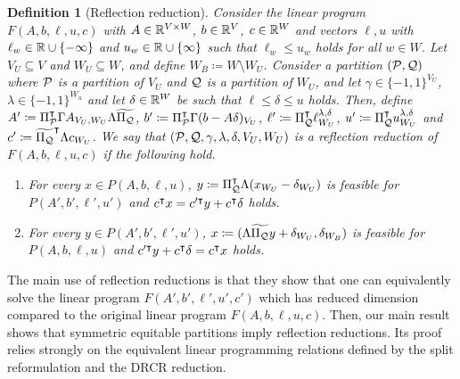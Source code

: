 \documentclass[pdflatex,sn-mathphys-num]{sn-jnl}%
\theoremstyle{thmstyleone}%
\newtheorem{definition}{Definition}
\theoremstyle{thmstylethree}%
\theoremstyle{thmstyletwo}%
\begin{document}
\begin{definition}[Reflection reduction]
    \label{def_refeqpart}
    Consider the linear program $F(A,b,\ell, u, c)$ with $A\in \mathbb{R}^{V\times W}$, $b\in \mathbb{R}^{V}$, $c\in \mathbb{R}^{W}$ and vectors $\ell, u$ with $\ell_w \in \mathbb{R} \cup \{-\infty\}$ and $u_w\in \mathbb{R} \cup \{\infty\} $ such that $\ell_w \leq u_w$ holds for all $w\in W$.
    Let $V_U\subseteq V$ and $W_U\subseteq W$, and define $W_B\coloneqq W\setminus W_U$.
    Consider a partition $(\mathcal{P},\mathcal{Q})$ where $\mathcal{P}$ is a partition of $V_U$ and $\mathcal{Q}$ is a partition of $W_U$, and let $\gamma\in \{-1,1\}^{V_U}$, $\lambda\in \{-1,1\}^{W_u}$ and let $\delta \in \mathbb{R}^W$ be such that $\ell \leq \delta \leq u$ holds.
    Then, define $A'\coloneqq \transpose{\Pi_{\MP}}\Gamma A_{V_U,W_U}\Lambda \widetilde{\Pi_{\MQ}}$, $b'\coloneqq \transpose{\Pi_{\MP}}\Gamma(b- A\delta)_{V_U}$, $\ell' \coloneqq \transpose{\Pi_{\MQ}} \ell^{\lambda,\delta}_{W_U}$, $u'\coloneqq  \transpose{\Pi_{\MQ}} u^{\lambda,\delta}_{W_U}$ and $c'\coloneqq \transpose{\widetilde{\Pi_\MQ}} \Lambda c_{W_U}$.
    We say that $(\mathcal{P},\mathcal{Q},\gamma,\lambda, \delta, V_U, W_U)$ is a \emph{reflection reduction} of $F(A,b,\ell,u,c)$ if the following hold.
    \begin{enumerate}[label=(\roman*)]
        \item \label{def_refeqpart_to_red} For every $x\in P(A,b,\ell,u)$, $y\coloneqq \transpose{\Pi_\MQ} \Lambda (x_{W_U}-\delta_{W_U})$ is feasible for $P(A',b',\ell',u')$ and $c^{\intercal} x = c'^{\intercal} y + c^{\intercal} \delta$ holds.
        \item \label{def_refeqpart_from_red} For every $y\in P(A',b',\ell',u')$,  $x \coloneqq ( \Lambda \widetilde{\Pi_\MQ} y + \delta_{W_U},\delta_{W_B})$ is feasible for $P(A,b,\ell,u)$ and $c'^{\intercal} y + c^{\intercal} \delta = c^{\intercal} x$ holds.
    \end{enumerate}
\end{definition}

The main use of reflection reductions is that they show that one can equivalently solve the linear program $F(A',b',\ell',u',c')$ which has reduced dimension compared to the original linear program $F(A,b,\ell,u,c)$. Then, our main result shows that symmetric equitable partitions imply reflection reductions. Its proof relies strongly on the equivalent linear programming relations defined by the split reformulation and the DRCR reduction.
\end{document}
